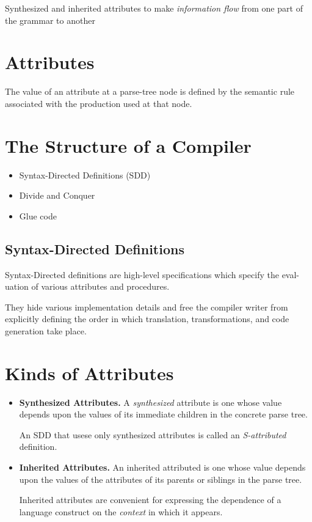 \documentclass[a4paper]{scrartcl}
\theoremstyle{definition}
\begin{document}
Synthesized and inherited attributes to make \emph{information flow} from one part of the grammar to another

\section{Attributes}
The value of an attribute at a parse-tree node is defined by the semantic rule associated with the production used at that node.

\section{The Structure of a Compiler}
\begin{itemize}
	\item Syntax-Directed Definitions (SDD)
	\item Divide and Conquer
	\item Glue code
\end{itemize}

\subsection{Syntax-Directed Definitions}
Syntax-Directed definitions are high-level specifications which specify the eval-
uation of various attributes and procedures.

They hide various implementation details and free the compiler writer from
explicitly defining the order in which translation, transformations, and code
generation take place.

\section{Kinds of Attributes}
\begin{itemize}
	\item \textbf{Synthesized Attributes.} A \emph{synthesized} attribute is one whose value depends upon the values of its immediate children in the concrete parse tree.

		An SDD that usese only synthesized attributes is called an \emph{S-attributed} definition.
	\item \textbf{Inherited Attributes.} An inherited attributed is one whose value depends upon the values of the attributes of its parents or siblings in the parse tree.

	Inherited attributes are convenient for expressing the dependence of a language construct on the \emph{context} in which it appears.
\end{itemize}
\end{document}
